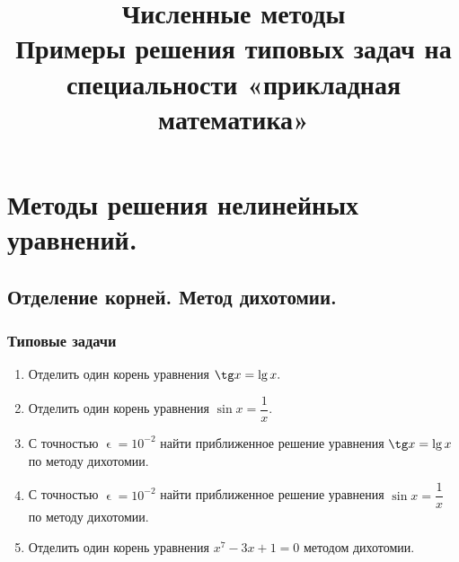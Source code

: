 \documentclass[a4paper, 12pt]{report}
\title{\textbf{\Huge{Численные методы}}\\Примеры решения типовых задач на специальности «прикладная математика»}
\date{}
\renewcommand{\epsilon}{\upvarepsilon}
\begin{document}
	\maketitle
	\tableofcontents{}
	\newpage
	\chapter{Методы решения нелинейных уравнений.}
	\section{Отделение корней. Метод дихотомии.}
	\subsection{Типовые задачи}
	\begin{enumerate}
		\item Отделить один корень уравнения $\tg x = \lg x.$
		\item Отделить один корень уравнения $\sin x = \dfrac1x.$
		\item С точностью $\epsilon=10^{-2}$ найти приближенное решение уравнения $\tg x = \lg x$ по методу дихотомии.
		\item С точностью $\epsilon=10^{-2}$ найти приближенное решение уравнения $\sin x = \dfrac1x$ по методу дихотомии.
		\item Отделить один корень уравнения $x^7 - 3x + 1 = 0$ методом дихотомии.
	\end{enumerate}
\end{document}
